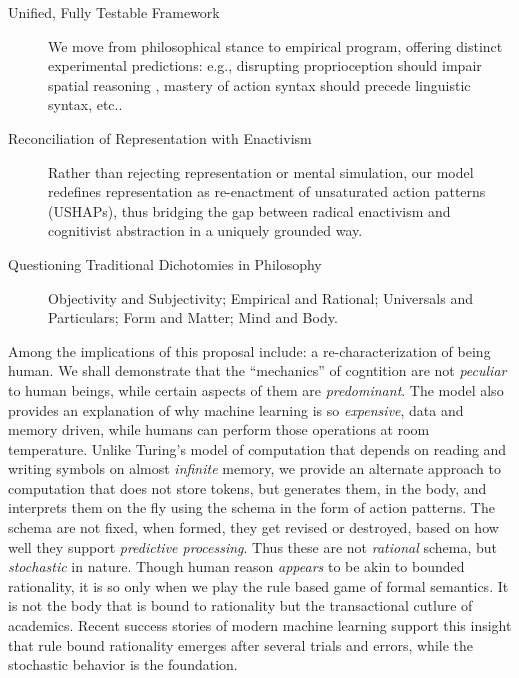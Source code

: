 \begin{description}
    \item[Unified, Fully Testable Framework]
    We move from philosophical stance to empirical program, offering distinct experimental predictions: e.g., disrupting proprioception should impair spatial reasoning \cite{proprioception_spatial, proprioception_reasoning}, mastery of action syntax should precede linguistic syntax, etc..

    \item[Reconciliation of Representation with Enactivism]
    Rather than rejecting representation or mental simulation, our model redefines representation as re-enactment of unsaturated action patterns (USHAPs), thus bridging the gap between radical enactivism and cognitivist abstraction in a uniquely grounded way.

    \item[Questioning Traditional Dichotomies in Philosophy]
    Objectivity and Subjectivity; Empirical and Rational; Universals and Particulars; Form and Matter; Mind and Body.

\end{description}


Among the implications of this proposal include: a re-characterization of being human. We shall demonstrate that the ``mechanics'' of cogntition are not \textit{peculiar} to human beings, while certain aspects of them are \textit{predominant}. The model also provides an explanation of why machine learning is so \textit{expensive}, data and memory driven, while humans can perform those operations at room temperature. Unlike Turing's model of computation that depends on reading and writing symbols on almost \textit{infinite} memory, we provide an alternate approach to computation that does not store tokens, but generates them, in the body, and interprets them on the fly using the schema in the form of action patterns. The schema are not fixed, when formed, they get revised or destroyed, based on how well they support \textit{predictive processing}. Thus these are not \textit{rational} schema, but \textit{stochastic} in nature. Though human reason \textit{appears} to be akin to bounded rationality, it is so only when we play the rule based game of formal semantics. It is not the body that is bound to rationality but the transactional cutlure of academics. Recent success stories of modern machine learning support this insight that rule bound rationality emerges after several trials and errors, while the stochastic behavior is the foundation. 

